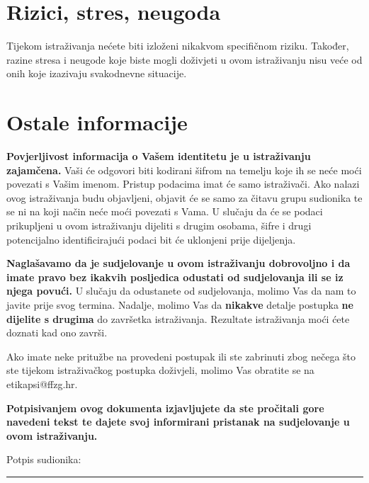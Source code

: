 \documentclass[11pt]{article}
\begin{document}
\section{Rizici, stres, neugoda}

Tijekom istraživanja nećete biti izloženi nikakvom specifičnom riziku. Također,
razine stresa i neugode koje biste mogli doživjeti u ovom istraživanju nisu veće
od onih koje izazivaju svakodnevne situacije.

\section{Ostale informacije}

\textbf{Povjerljivost informacija o Vašem identitetu je u istraživanju
zajamčena.} Vaši će odgovori biti kodirani šifrom na temelju koje ih se neće
moći povezati s Vašim imenom. Pristup podacima imat će samo istraživači. Ako
nalazi ovog istraživanja budu objavljeni, objavit će se samo za čitavu grupu
sudionika te se ni na koji način neće moći povezati s Vama. U slučaju da će se
podaci prikupljeni u ovom istraživanju dijeliti s drugim osobama, šifre i drugi
potencijalno identificirajući podaci bit će uklonjeni prije dijeljenja.

\textbf{Naglašavamo da je sudjelovanje u ovom istraživanju dobrovoljno i da
imate pravo bez ikakvih posljedica odustati od sudjelovanja ili se iz njega
povući.} U slučaju da odustanete od sudjelovanja, molimo Vas da nam to javite
prije svog termina.
Nadalje, molimo Vas da \textbf{nikakve} detalje postupka \textbf{ne dijelite s
drugima} do završetka istraživanja. Rezultate istraživanja moći ćete doznati
kad ono završi.

\vspace{2em}

\noindent Ako imate neke pritužbe na provedeni postupak ili ste
zabrinuti zbog nečega što ste tijekom istraživačkog postupka doživjeli, molimo
Vas obratite se na etikapsi@ffzg.hr.

\vspace{2em}

\noindent \textbf{Potpisivanjem ovog dokumenta izjavljujete da ste pročitali
    gore navedeni tekst te dajete svoj informirani pristanak na sudjelovanje u
ovom istraživanju.} 
\vspace*{5em}

\noindent Potpis sudionika: \rule{6cm}{0.15mm}
\end{document}
